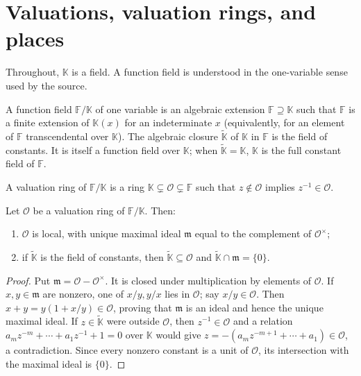 \chapter{Valuations, valuation rings, and places}
\label{par-chap-foundations}
\uses{}
Throughout, $\mathbb K$ is a field. A function field is understood in the
one-variable sense used by the source.

\begin{definition}
\label{par-def-function-field}
\uses{}
A function field $\mathbb F/\mathbb K$ of one variable is an algebraic extension
$\mathbb F\supseteq\mathbb K$ such that $\mathbb F$ is a finite extension of
$\mathbb K(x)$ for an indeterminate $x$ (equivalently, for an element of
$\mathbb F$ transcendental over $\mathbb K$). The algebraic closure $\widetilde{\mathbb K}$
of $\mathbb K$ in $\mathbb F$ is the field of constants. It is itself a function
field over $\mathbb K$; when $\widetilde{\mathbb K}=\mathbb K$, $\mathbb K$ is
the full constant field of $\mathbb F$.
\end{definition}

\begin{definition}
\label{par-def-valuation-ring}
\uses{}
A valuation ring of $\mathbb F/\mathbb K$ is a ring $\mathbb K\subsetneq\mathcal O
\subsetneq\mathbb F$ such that $z\notin\mathcal O$ implies $z^{-1}\in\mathcal O$.
\end{definition}

\begin{theorem}
\label{par-thm-valuation-ring-basic}
\uses{}
Let $\mathcal O$ be a valuation ring of $\mathbb F/\mathbb K$. Then:
\begin{enumerate}
\item $\mathcal O$ is local, with unique maximal ideal $\mathfrak m$ equal to
the complement of $\mathcal O^\times$;
\item if $\widetilde{\mathbb K}$ is the field of constants, then
$\widetilde{\mathbb K}\subseteq\mathcal O$ and
$\widetilde{\mathbb K}\cap\mathfrak m=\{0\}$.
\end{enumerate}
\end{theorem}
\begin{proof}
Put $\mathfrak m=\mathcal O-\mathcal O^\times$. It is closed under
multiplication by elements of $\mathcal O$. If $x,y\in\mathfrak m$ are nonzero,
one of $x/y,y/x$ lies in $\mathcal O$; say $x/y\in\mathcal O$. Then
$x+y=y(1+x/y)\in\mathcal O$, proving that $\mathfrak m$ is an ideal and hence
the unique maximal ideal. If $z\in\widetilde{\mathbb K}$ were outside $\mathcal O$,
then $z^{-1}\in\mathcal O$ and a relation
$a_mz^{-m}+\cdots+a_1z^{-1}+1=0$ over $\mathbb K$ would give
$z=-(a_mz^{-m+1}+\cdots+a_1)\in\mathcal O$, a contradiction. Since every
nonzero constant is a unit of $\mathcal O$, its intersection with the maximal
ideal is $\{0\}$.
\end{proof}

